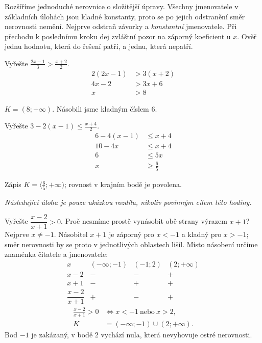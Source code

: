 \documentclass[11pt,a4paper]{article}
\begin{document}
Rozšíříme jednoduché nerovnice o složitější úpravy. Všechny jmenovatele v základních úlohách jsou kladné konstanty, proto se po jejich odstranění směr nerovnosti nemění.
Nejprve odstraň závorky a \emph{konstantní} jmenovatele. Při přechodu k poslednímu kroku dej zvláštní pozor na záporný koeficient u $x$. Ověř jednu hodnotu, která do řešení patří, a jednu, která nepatří.
\begin{prikladReseniBox}[title={Příklad 1}]
Vyřešte $\frac{2x-1}{3}>\frac{x+2}{2}$.
\tcblower
\begin{align*}
2(2x-1)&>3(x+2) \\
 4x-2&>3x+6 \\
 x&>8
\end{align*}

$K=(8;+\infty)$. Násobili jsme kladným číslem $6$.
\end{prikladReseniBox}
\begin{prikladReseniBox}[title={Příklad 2}]
Vyřešte $3-2(x-1)\le\frac{x+4}{2}$.
\tcblower
\begin{align*}
6-4(x-1)&\le x+4 \\
 10-4x&\le x+4 \\
 6&\le5x \\
 x&\ge\frac65
\end{align*}

Zápis $K=\langle\frac65;+\infty)$; rovnost v krajním bodě je povolena.
\end{prikladReseniBox}
\textit{Následující úloha je pouze ukázkou rozdílu, nikoliv povinným cílem této hodiny.}

\begin{prikladReseniBox}[title={Příklad 3}]
Vyřešte $\dfrac{x-2}{x+1}>0$. Proč nesmíme prostě vynásobit obě strany výrazem $x+1$?
\tcblower
Nejprve $x\ne-1$. Násobitel $x+1$ je záporný pro $x<-1$ a kladný pro $x>-1$; směr nerovnosti by se proto v jednotlivých oblastech lišil. Místo násobení určíme znaménka čitatele a jmenovatele:
\[
\begin{array}{c|ccc}
 x & (-\infty;-1)&(-1;2)&(2;+\infty)\\\hline
 x-2&-&-&+\\
 x+1&-&+&+\\\hline
 \dfrac{x-2}{x+1}&+&-&+
\end{array}
\]
\begin{align*}
\frac{x-2}{x+1}>0&\iff x<-1\ \text{nebo}\ x>2,\\
K&=(-\infty;-1)\cup(2;+\infty).
\end{align*}
Bod $-1$ je zakázaný, v bodě $2$ vychází nula, která nevyhovuje ostré nerovnosti.
\end{prikladReseniBox}
\end{document}
